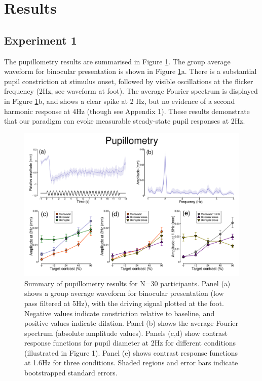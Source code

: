 \documentclass[
]{article}
\begin{document}
\hypertarget{results}{%
\section{Results}\label{results}}

\hypertarget{experiment-1}{%
\subsection{Experiment 1}\label{experiment-1}}

The pupillometry results are summarised in Figure \ref{fig:pupildata}. The group average waveform for binocular presentation is shown in Figure \ref{fig:pupildata}a. There is a substantial pupil constriction at stimulus onset, followed by visible oscillations at the flicker frequency (2Hz, see waveform at foot). The average Fourier spectrum is displayed in Figure \ref{fig:pupildata}b, and shows a clear spike at 2 Hz, but no evidence of a second harmonic response at 4Hz (though see Appendix 1). These results demonstrate that our paradigm can evoke measurable steady-state pupil responses at 2Hz.

\begin{figure}

{\centering \includegraphics{Figures/pupildata} 

}

\caption{Summary of pupillometry results for N=30 participants. Panel (a) shows a group average waveform for binocular presentation (low pass filtered at 5Hz), with the driving signal plotted at the foot. Negative values indicate constriction relative to baseline, and positive values indicate dilation. Panel (b) shows the average Fourier spectrum (absolute amplitude values). Panels (c,d) show contrast response functions for pupil diameter at 2Hz for different conditions (illustrated in Figure 1). Panel (e) shows contrast response functions at 1.6Hz for three conditions. Shaded regions and error bars indicate bootstrapped standard errors.}\label{fig:pupildata}
\end{figure}
\end{document}
